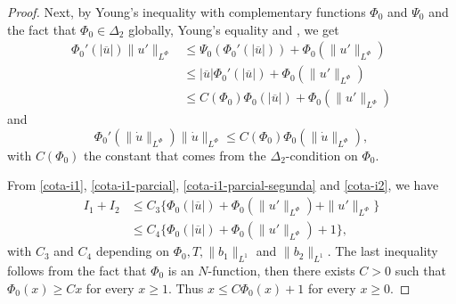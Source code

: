 \documentclass[twoside]{article}
\theoremstyle{remark}
\newcommand{\orlnor}{\|_{L^{\Phi}}}
\renewcommand{\leq}{\leqslant}
\renewcommand{\geq}{\geqslant}
\begin{document}
\begin{proof}
Next, by Young's inequality with complementary functions $\Phi_0$ and $\Psi_0$ and the fact that 
$\Phi_0 \in \Delta_2$ globally, Young's equality \cite[Eq. 2.7-2.8]{KR} and \cite[Th. 3-(ii), p. 23]{rao1991theory}, we get
\begin{equation}\label{cota-i1-parcial}
 \begin{split}
\Phi_0'(|\overline{u}|) \|u'\orlnor
&\leq 
\Psi_0(\Phi_0'(|\overline{u}|))+
\Phi_0(\|u'\orlnor)
\\
&\leq 
|\overline{u}|\Phi_0'(|\overline{u}|)
+\Phi_0(\|u'\orlnor)
\\
&\leq C(\Phi_0)
\Phi_0(|\overline{u}|)
+\Phi_0(\|u'\orlnor)
\end{split}
\end{equation}
and 
\begin{equation}\label{cota-i1-parcial-segunda}
\Phi_0'(\|\dot{u}\orlnor) \|\dot{u}\orlnor
\leq 
C(\Phi_0) \Phi_0(\|\dot{u}\orlnor),
\end{equation}
with $C(\Phi_0)$ the constant that comes from the $\Delta_2$-condition on $\Phi_0$.

From \eqref{cota-i1}, \eqref{cota-i1-parcial}, \eqref{cota-i1-parcial-segunda} and \eqref{cota-i2},
we have
\begin{equation}\label{cota-i1-i2}
\begin{split}
I_1+I_2
&
\leq C_3
\bigg\{ 
\Phi_0(|\overline{u}|)
+\Phi_0(\|u'\orlnor)
+\|u'\orlnor
\bigg\}\\
&
\leq C_4
\bigg\{ 
\Phi_0(|\overline{u}|)
+\Phi_0(\|u'\orlnor)
+1
\bigg\},
\end{split}
\end{equation}
with $C_3$ and $C_4$ depending on $\Phi_0,T, \|b_1\|_{L^1}$ and $\|b_2\|_{L^1} $. The last inequality follows from the fact that $\Phi_0$ is an $N$-function, then there exists $C>0$ such that $\Phi_0(x)\geq Cx$ for every $x\geq 1$. Thus $x\leq C\Phi_0(x)+1$ for every $x\geq 0$.



\end{proof}
\end{document}
